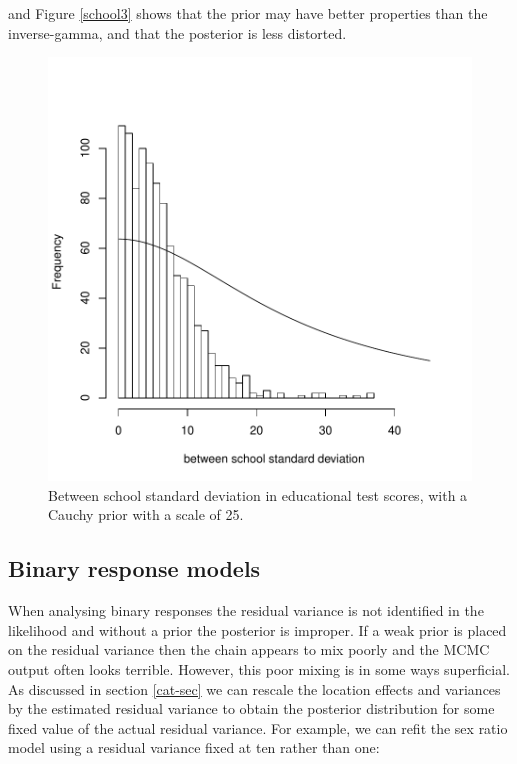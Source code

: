 \documentclass{article}
\begin{document}
\begin{Schunk}
\end{Schunk}

and Figure \ref{school3} shows that the prior may have better properties than the inverse-gamma, and that the posterior is less distorted.


\begin{figure}[!h]
\begin{center}
\includegraphics{Lecture8-017}
\end{center}
\caption{Between school standard deviation in educational test scores, with a Cauchy prior with a scale of 25.}
\label{school3-fig}
\end{figure}

\subsection{Binary response models}

When analysing binary responses the residual variance is not identified in the likelihood and without a prior the posterior is improper.  If a weak prior is placed on the residual variance then the chain appears to mix poorly and the MCMC output often looks terrible. However, this poor mixing is in some ways superficial. As discussed in section \ref{cat-sec} we can rescale the location effects and variances by the estimated residual variance to obtain the posterior distribution for some fixed value of the actual residual variance. For example, we can refit the sex ratio model using a residual variance fixed at ten rather than one:
\end{document}
